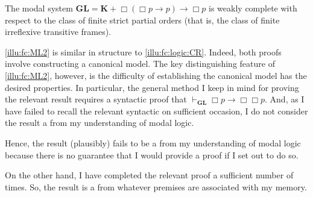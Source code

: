 \begin{note}[ML II]
  \begin{illustration}
    \label{illu:fc:ML2}
    The modal system \(\mathbf{GL} = \mathbf{K} + \Box(\Box p \rightarrow p) \rightarrow \Box p\) is weakly complete with respect to the class of finite strict partial orders (that is, the class of finite irreflexive transitive frames).
  \end{illustration}

  \autoref{illu:fc:ML2} is similar in structure to \autoref{illu:fc:logic:CR}.
  Indeed, both proofs involve constructing a canonical model.
  The key distinguishing feature of \autoref{illu:fc:ML2}, however, is the difficulty of establishing the canonical model has the desired properties.
  In particular, the general method I keep in mind for proving the relevant result requires a syntactic proof that \(\vdash_{\mathbf{GL}} \Box p \rightarrow \Box \Box p\).
  And, as I have failed to recall the relevant syntactic on sufficient occasion, I do not consider the result a  from my understanding of modal logic.

  Hence, the result (plausibly) fails to be a \fc{} from my understanding of modal logic because there is no guarantee that I would provide a proof if I set out to do so.

  On the other hand, I have completed the relevant proof a sufficient number of times.
  So, the result is a  from whatever premises are associated with my memory.
\end{note}

